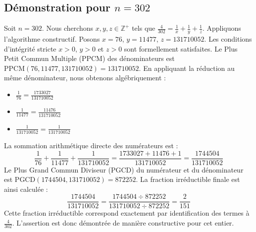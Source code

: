 \documentclass[11pt,a4paper]{article}
\begin{document}
\subsection{Démonstration pour $n = 302$}
Soit $n = 302$. Nous cherchons $x, y, z \in \mathbb{Z}^{+}$ tels que $\frac{4}{302} = \frac{1}{x} + \frac{1}{y} + \frac{1}{z}$.
Appliquons l'algorithme constructif. Posons $x = 76$, $y = 11477$, $z = 131710052$.
Les conditions d'intégrité stricte $x > 0$, $y > 0$ et $z > 0$ sont formellement satisfaites.
Le Plus Petit Commun Multiple (PPCM) des dénominateurs est $\text{PPCM}(76, 11477, 131710052) = 131710052$.
En appliquant la réduction au même dénominateur, nous obtenons algébriquement :
\begin{itemize}
    \item $\frac{1}{76} = \frac{1733027}{131710052}$
    \item $\frac{1}{11477} = \frac{11476}{131710052}$
    \item $\frac{1}{131710052} = \frac{1}{131710052}$
\end{itemize}
La sommation arithmétique directe des numérateurs est :
$$ \frac{1}{76} + \frac{1}{11477} + \frac{1}{131710052} = \frac{1733027 + 11476 + 1}{131710052} = \frac{1744504}{131710052} $$
Le Plus Grand Commun Diviseur (PGCD) du numérateur et du dénominateur est $\text{PGCD}(1744504, 131710052) = 872252$.
La fraction irréductible finale est ainsi calculée :
$$ \frac{1744504}{131710052} = \frac{1744504 \div 872252}{131710052 \div 872252} = \frac{2}{151} $$
Cette fraction irréductible correspond exactement par identification des termes à $\frac{4}{302}$. L'assertion est donc démontrée de manière constructive pour cet entier.
\end{document}
